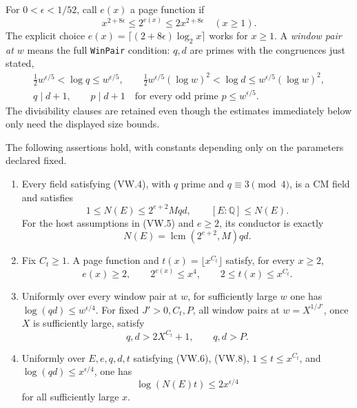 For $0<\epsilon<1/52$, call $e(x)$ a page function if
\[
 x^{2+8\epsilon}\le2^{e(x)}\le2x^{2+8\epsilon}
                  \quad(x\ge1).
 \tag{VW.6}
\]
The explicit choice
$e(x)=\lceil(2+8\epsilon)\log_2x\rceil$ works for $x\ge1$.
A \emph{window pair at $w$} means the full \texttt{WinPair} condition:
$q,d$ are primes with the congruences just stated,
\begin{gather*}
 \tfrac12w^{\epsilon/5}<\log q\le w^{\epsilon/5},\qquad
 \tfrac12w^{\epsilon/5}(\log w)^2<\log d
                   \le w^{\epsilon/5}(\log w)^2,\\
 q\mid d+1,\qquad
 p\mid d+1\quad\text{for every odd prime }p\le w^{\epsilon/5}.
 \tag{VW.7}
\end{gather*}
The divisibility clauses are retained even though the estimates immediately
below only need the displayed size bounds.

\begin{proposition}
\label{prop:vw-budget}
The following assertions hold, with constants depending only on the
parameters declared fixed.
\begin{enumerate}
\item Every field satisfying (VW.4), with $q$ prime and $q\equiv3\pmod4$,
is a CM field and satisfies
\[
 1\le N(E)\le2^{e+2}Mqd,\qquad [E:\mathbb Q]\le N(E).
 \tag{VW.8}
\]
For the host assumptions in (VW.5) and $e\ge2$, its conductor is exactly
\[
                 N(E)=\operatorname{lcm}(2^{e+2},M)qd.
                 \tag{VW.9}
\]
\item Fix $C_t\ge1$.  A page function and $t(x)=\lfloor x^{C_t}\rfloor$
satisfy, for every $x\ge2$,
\[
 e(x)\ge2,\qquad 2^{e(x)}\le x^4,\qquad
             2\le t(x)\le x^{C_t}.
 \tag{VW.10}
\]
\item Uniformly over every window pair at $w$, for sufficiently large
$w$ one has $\log(qd)\le w^{\epsilon/4}$.  For fixed $J'>0,C_t,P$,
all window pairs at $w=X^{1/J'}$, once $X$ is sufficiently large, satisfy
\[
 q,d>2X^{C_t}+1,\qquad q,d>P.
 \tag{VW.11}
\]
\item Uniformly over $E,e,q,d,t$ satisfying (VW.6), (VW.8),
$1\le t\le x^{C_t}$, and $\log(qd)\le x^{\epsilon/4}$, one has
\[
                    \log(N(E)t)\le2x^{\epsilon/4}
                    \tag{VW.12}
\]
for all sufficiently large $x$.
\end{enumerate}
\end{proposition}

